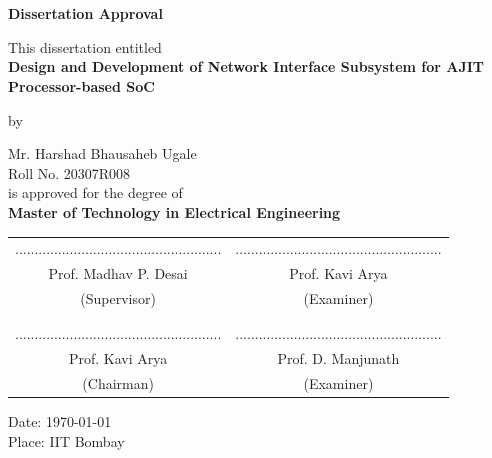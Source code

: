 \documentclass[12pt]{report}
\begin{document}
\newpage
{}
\chapter*{}
\begin{center}
{\Large \textbf{Dissertation Approval}}

\bigskip
\bigskip
\bigskip
This dissertation entitled\\
\bigskip
\textbf{Design and Development of Network Interface Subsystem for AJIT Processor-based SoC}\\
\bigskip

by\\
\bigskip

Mr. Harshad Bhausaheb Ugale\\
Roll No. 20307R008\\
\bigskip
is   approved for the degree of\\
\textbf{Master of Technology in Electrical Engineering}\\

\end{center}
 \vspace{10mm}
\begingroup
\setlength{\tabcolsep}{30pt}
\begin{center}
    \begin{tabular}{c c}
        ..................................................... & .....................................................\\
        Prof. Madhav P. Desai & Prof. Kavi Arya\\
        (Supervisor)     & (Examiner)\\
        \\\\
        ..................................................... & .....................................................\\
        Prof. Kavi Arya   & Prof. D. Manjunath\\
        (Chairman) & (Examiner)\\
    \end{tabular}
\end{center}
\endgroup
\bigskip
{Date: \today}\\
{Place: IIT Bombay}


\newpage
\end{document}
